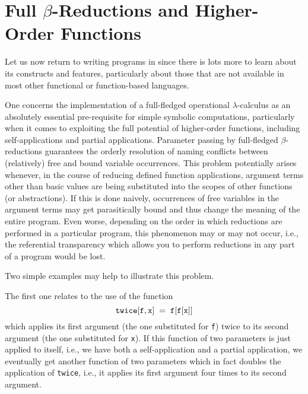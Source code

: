 \section{Full $\beta$-Reductions and Higher-Order Functions}
Let us now return to writing programs in \kir since there is lots more
to learn about its constructs and features, particularly about those 
that are not available in most other functional or function-based languages.

One concerns the implementation of a full-fledged operational 
{\mys $\lambda$-calculus} as an absolutely essential pre-requisite for
simple {\mys symbolic computations}, particularly when it comes
to exploiting the full
potential of {\mys higher-order functions}, including {\mys self-applications}
and {\mys partial applications}. Parameter passing by full-fledged 
{\mys $\beta$-reductions} guarantees the orderly
resolution of {\mys naming conflicts} between (relatively) free
and bound variable occurrences.  This problem potentially  arises
whenever, in the course of reducing defined function applications,
argument terms other than basic values are being substituted into the scopes
of other functions (or abstractions). If this is done naively, occurrences
of free variables in the argument terms may get {\mys parasitically
bound} and thus change the meaning of the entire program. Even worse,
depending on the order in which reductions are
performed in a particular program, this phenomenon may 
or may not occur, i.e., the {\mys referential transparency} which allows you
to perform reductions in any part of a program would be lost.  

Two simple examples may help to illustrate this problem.

The first one relates to the use of the function
$$
{\tt twice[f,x]\;=\;f[f[x]]} 
$$
which applies its first argument (the one substituted for {\tt f}) twice
to its second argument (the one substituted for {\tt x}). If this function
of two parameters is just applied to itself, i.e., we have both
a {\mys self-application} and a {\mys partial application}, we eventually
 get another
function of two parameters which in fact doubles the application
 of {\tt twice},
i.e., it applies its first argument four times to its second argument.

